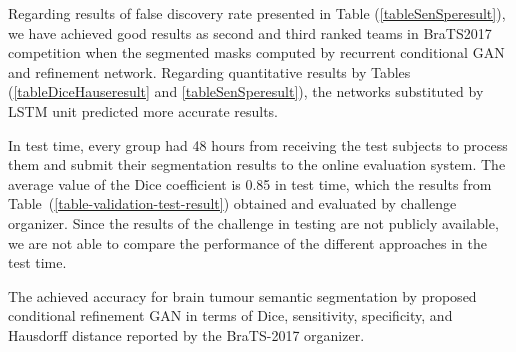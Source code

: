 \documentclass[10pt,twocolumn,letterpaper]{article}
\begin{document}
Regarding results of false discovery rate presented in Table (\ref{tableSenSperesult}), we have achieved good results as second and third ranked teams in BraTS2017 competition when the segmented masks computed by recurrent conditional GAN and refinement network. 
Regarding quantitative results by Tables (\ref{tableDiceHauseresult} and \ref{tableSenSperesult}), the networks substituted by LSTM unit predicted more accurate results.

In test time, every group had 48 hours from receiving the test subjects to process them and submit their segmentation results to the online evaluation system.
The average value of the Dice coefficient is 0.85 in test time, which the results from Table~(\ref{table-validation-test-result}) obtained and evaluated by challenge organizer. Since the results of the challenge in testing are not publicly available, we are not able to compare the performance of the different approaches in the test time.
\centering
\caption{The achieved accuracy for brain tumour semantic segmentation by proposed conditional refinement GAN in terms of Dice, sensitivity, specificity, and Hausdorff distance reported by the BraTS-2017 organizer.}
\end{document}
